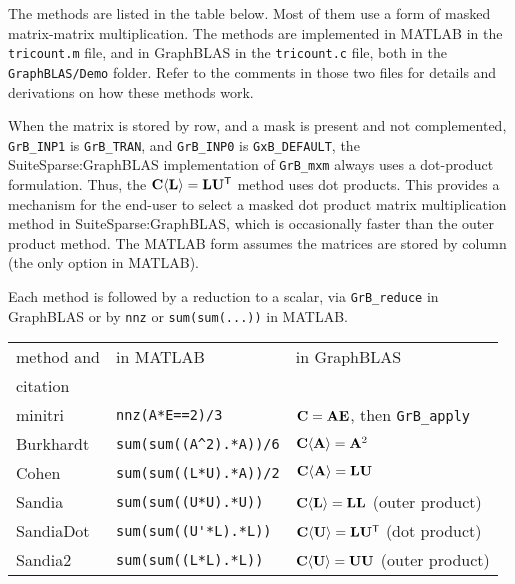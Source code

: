 \documentclass[12pt]{article}
\begin{document}
The methods are listed in the table below.  Most of them use a form of masked
matrix-matrix multiplication.  The methods are implemented in MATLAB in the
\verb'tricount.m' file, and in GraphBLAS in the \verb'tricount.c' file, both in
the \verb'GraphBLAS/Demo' folder.  Refer to the comments in those two files for
details and derivations on how these methods work.

When the matrix is stored by row, and a mask is present and not complemented,
\verb'GrB_INP1' is \verb'GrB_TRAN', and \verb'GrB_INP0' is \verb'GxB_DEFAULT',
the SuiteSparse:GraphBLAS implementation of \verb'GrB_mxm' always uses a
dot-product formulation.  Thus, the ${\bf C \langle L \rangle} = {\bf L}{\bf
U}^{\sf T}$ method uses dot products.  This provides a mechanism for the
end-user to select a masked dot product matrix multiplication method in
SuiteSparse:GraphBLAS, which is occasionally faster than the outer product
method.  The MATLAB form assumes the matrices are stored by column
(the only option in MATLAB).

Each method is followed by a reduction to a scalar, via \verb'GrB_reduce' in
GraphBLAS or by \verb'nnz' or \verb'sum(sum(...))' in MATLAB.

\vspace{0.05in}
\noindent
{\footnotesize
\begin{tabular}{lll}
\hline
method and     & in MATLAB & in GraphBLAS \\
citation    & & \\
\hline
minitri \cite{WolfBerryStark15} & \verb"nnz(A*E==2)/3"
    & ${\bf C}={\bf AE}$, then \verb'GrB_apply' \\
Burkhardt \cite{Burkhardt16} & \verb"sum(sum((A^2).*A))/6"
    & ${\bf C \langle A \rangle} = {\bf A}^2$ \\
Cohen \cite{AzadBulucGilbert15,Cohen09} & \verb"sum(sum((L*U).*A))/2"
    & ${\bf C \langle A \rangle} = {\bf LU}$ \\
Sandia \cite{WolfDeveciBerryHammondRajamanickam17} & \verb"sum(sum((U*U).*U))"
    & ${\bf C \langle L \rangle} = {\bf LL}$ (outer product) \\
SandiaDot & \verb"sum(sum((U'*L).*L))"
    & ${\bf C \langle U \rangle} = {\bf L}{\bf U}^{\sf T}$ (dot product) \\
Sandia2  & \verb"sum(sum((L*L).*L))"
    & ${\bf C \langle U \rangle} = {\bf UU}$ (outer product) \\
\hline
\end{tabular}
}
\vspace{0.05in}
\end{document}
